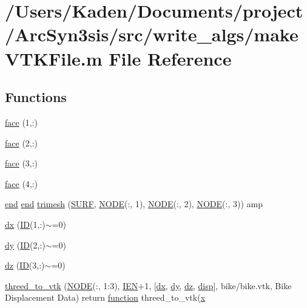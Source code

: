 \hypertarget{a00611}{}\section{/\+Users/\+Kaden/\+Documents/project/\+Arc\+Syn3sis/src/write\+\_\+algs/make\+V\+T\+K\+File.m File Reference}
\label{a00611}
\subsection*{Functions}
\begin{DoxyCompactItemize}
\item 
\hyperlink{a00611_a9109c446b437fff787b51f7eb55988c3}{face} (1,\+:)
\item 
\hyperlink{a00611_ac5bf1b71e187f9509de1f13415fadd23}{face} (2,\+:)
\item 
\hyperlink{a00611_a2f070a21ac519a099c6eb56f4902f34e}{face} (3,\+:)
\item 
\hyperlink{a00611_ac4ec0037ba529da25bf084669a45f60c}{face} (4,\+:)
\item 
\hyperlink{a00608_afb358f48b1646c750fb9da6c6585be2b}{end} \hyperlink{a00608_afb358f48b1646c750fb9da6c6585be2b}{end} \hyperlink{a00611_aca850f98d0fd5a09a5215f6b630cc917}{trimesh} (\hyperlink{a00611_acc2cee21ea7e7da5015e0957c291ff80}{S\+U\+RF}, \hyperlink{a00605_a28010846a3742b3c2c07f00b1f1536ff}{N\+O\+DE}(\+:, 1), \hyperlink{a00605_a28010846a3742b3c2c07f00b1f1536ff}{N\+O\+DE}(\+:, 2), \hyperlink{a00605_a28010846a3742b3c2c07f00b1f1536ff}{N\+O\+DE}(\+:, 3)) amp
\item 
\hyperlink{a00611_a10f67af5e1d220643edf9cd9ccdc426b}{dx} (\hyperlink{a00605_a094c367727273b4da2b960ca3b3edc06}{ID}(1,\+:)$\sim$=0)
\item 
\hyperlink{a00611_a66c42e6dfe3bf4a7280776629fb6edc8}{dy} (\hyperlink{a00605_a094c367727273b4da2b960ca3b3edc06}{ID}(2,\+:)$\sim$=0)
\item 
\hyperlink{a00611_aa013aecd01d4bdb525771fd6ec6bd9bb}{dz} (\hyperlink{a00605_a094c367727273b4da2b960ca3b3edc06}{ID}(3,\+:)$\sim$=0)
\item 
\hyperlink{a00611_a66abe865455373ad07c84e89b14fe7ee}{threed\+\_\+to\+\_\+vtk} (\hyperlink{a00605_a28010846a3742b3c2c07f00b1f1536ff}{N\+O\+DE}(\+:, 1\+:3), \hyperlink{a00608_ada37e689768b959686f183a3d534464b}{I\+EN}\textquotesingle{}+1, \mbox{[}\hyperlink{a00611_a10f67af5e1d220643edf9cd9ccdc426b}{dx}, \hyperlink{a00611_a66c42e6dfe3bf4a7280776629fb6edc8}{dy}, \hyperlink{a00611_aa013aecd01d4bdb525771fd6ec6bd9bb}{dz}, \hyperlink{a00473_a7b5a959e1fa05b85090f4f729b0f9784}{disp}\mbox{]}, \textquotesingle{}bike/bike.\+vtk\textquotesingle{}, \textquotesingle{}Bike Displacement Data\textquotesingle{}) return \hyperlink{a00611_a2420833d971716e9bab41cc9fb3abba1}{function} threed\+\_\+to\+\_\+vtk(\hyperlink{a00605_ac98c3bb25378222646e977292011625f}{x}

\end{DoxyCompactItemize}
